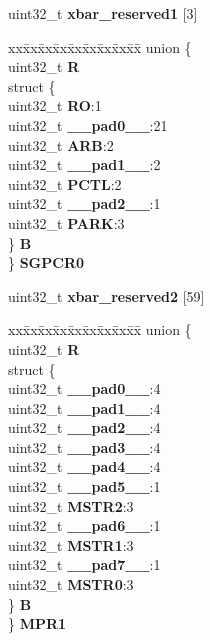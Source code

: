 \begin{DoxyCompactItemize}
\begin{tabbing}
\end{tabbing}\item 
\mbox{\label{structXBAR__tag_a1fca3344a1b53d1a005ce7762ea6c5f1}} 
uint32\+\_\+t {\bfseries xbar\+\_\+reserved1} \mbox{[}3\mbox{]}
\item 
\mbox{\label{structXBAR__tag_a937c66628ba7f5341cd512eed078bc79}} 
\begin{tabbing}
xx\=xx\=xx\=xx\=xx\=xx\=xx\=xx\=xx\=\kill
union \{\\
\>uint32\_t {\bfseries R}\\
\>struct \{\\
\>\>uint32\_t {\bfseries RO}:1\\
\>\>uint32\_t {\bfseries \_\_pad0\_\_}:21\\
\>\>uint32\_t {\bfseries ARB}:2\\
\>\>uint32\_t {\bfseries \_\_pad1\_\_}:2\\
\>\>uint32\_t {\bfseries PCTL}:2\\
\>\>uint32\_t {\bfseries \_\_pad2\_\_}:1\\
\>\>uint32\_t {\bfseries PARK}:3\\
\>\} {\bfseries B}\\
\} {\bfseries SGPCR0}\\

\end{tabbing}\item 
\mbox{\label{structXBAR__tag_aa1f3abcbf416ca10b6c61eaecd8b355b}} 
uint32\+\_\+t {\bfseries xbar\+\_\+reserved2} \mbox{[}59\mbox{]}
\item 
\mbox{\label{structXBAR__tag_aa723dd62d3c2d0f381d4badc6e8b62cd}} 
\begin{tabbing}
xx\=xx\=xx\=xx\=xx\=xx\=xx\=xx\=xx\=\kill
union \{\\
\>uint32\_t {\bfseries R}\\
\>struct \{\\
\>\>uint32\_t {\bfseries \_\_pad0\_\_}:4\\
\>\>uint32\_t {\bfseries \_\_pad1\_\_}:4\\
\>\>uint32\_t {\bfseries \_\_pad2\_\_}:4\\
\>\>uint32\_t {\bfseries \_\_pad3\_\_}:4\\
\>\>uint32\_t {\bfseries \_\_pad4\_\_}:4\\
\>\>uint32\_t {\bfseries \_\_pad5\_\_}:1\\
\>\>uint32\_t {\bfseries MSTR2}:3\\
\>\>uint32\_t {\bfseries \_\_pad6\_\_}:1\\
\>\>uint32\_t {\bfseries MSTR1}:3\\
\>\>uint32\_t {\bfseries \_\_pad7\_\_}:1\\
\>\>uint32\_t {\bfseries MSTR0}:3\\
\>\} {\bfseries B}\\
\} {\bfseries MPR1}\\


\end{tabbing}
\end{DoxyCompactItemize}
